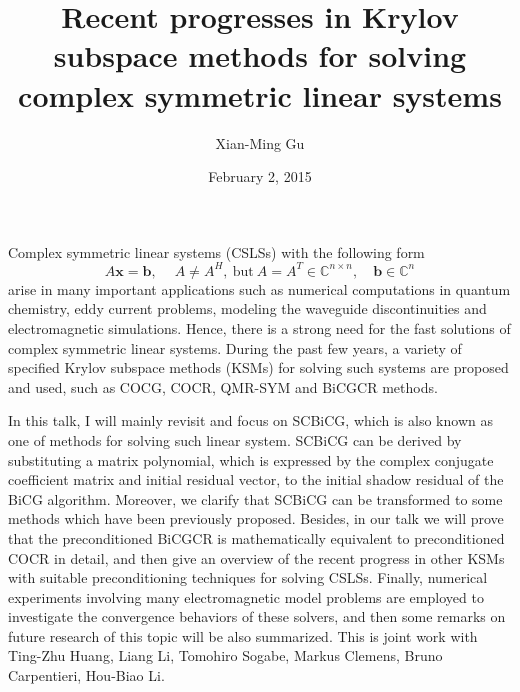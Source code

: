\documentclass{article}
\title{Recent progresses in Krylov subspace methods for solving complex symmetric linear systems}
\author{Xian-Ming Gu}
\affil{PhD student at Rijksuniversiteit Groningen and University of Electronic Science and Technology of China}
\date{February 2, 2015}
\begin{document}
\maketitle
Complex symmetric linear systems (CSLSs) with the following form
\begin{equation*}
A{\bm x} = {\bm b}, \quad\ A\neq A^H,\ \mathrm{but}\ A = A^T \in
\mathbb{C}^{n\times n},\quad {\bm b}\in \mathbb{C}^n
\end{equation*}
arise in many important applications such as numerical computations
in quantum chemistry, eddy current problems, modeling the waveguide
discontinuities and electromagnetic simulations. Hence, there is a
strong need for the fast solutions of complex symmetric linear systems.
During the past few years, a variety of specified Krylov subspace methods
(KSMs) for solving such systems are proposed and used, such as COCG, COCR,
QMR-SYM and BiCGCR methods.

In this talk, I will mainly revisit and focus on SCBiCG, which is also
known as one of methods for solving such linear system. SCBiCG can be
derived by substituting a matrix polynomial, which is expressed by the
complex conjugate coefficient matrix and initial residual vector, to
the initial shadow residual of the BiCG algorithm. Moreover, we clarify
that SCBiCG can be transformed to some methods which have been previously
proposed. Besides, in our talk we will prove that the preconditioned BiCGCR
is mathematically equivalent to preconditioned COCR in detail, and then give
an overview of the recent progress in other KSMs with suitable preconditioning
techniques for solving CSLSs. Finally, numerical experiments involving many
electromagnetic model problems are employed to investigate the convergence
behaviors of these solvers, and then some remarks on future research of this
topic will be also summarized.
\newline
\newline
\indent This is joint work with Ting-Zhu Huang, Liang Li, Tomohiro Sogabe,
Markus Clemens, Bruno Carpentieri, Hou-Biao Li.
\end{document}
